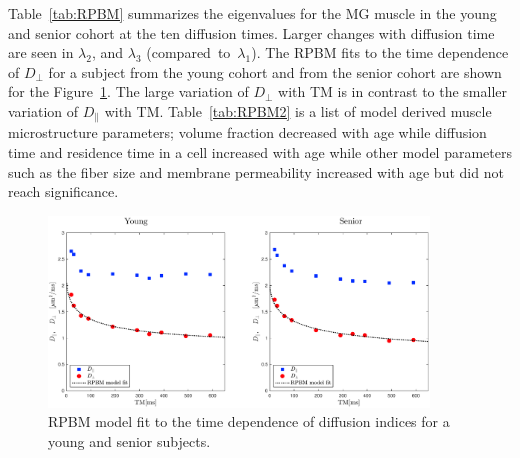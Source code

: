 Table~\ref{tab:RPBM} summarizes the eigenvalues for the MG muscle in the young and senior cohort at the ten diffusion times. 
Larger changes with diffusion time are seen in $\lambda_2$, and $\lambda_3$ (compared~to~$\lambda_1$). 
The RPBM fits to the time dependence of $D_\perp$ for a subject from the young cohort and from the senior cohort are shown for the Figure~\ref{fig:RPBM fit}. The large variation of $D_\perp$ with TM is in contrast to the smaller variation of $D_\parallel$ with TM.
Table~\ref{tab:RPBM2} is a list of model derived muscle microstructure parameters; volume fraction decreased with age while diffusion time and residence time in a cell increased with age while other model parameters such as the fiber size and membrane permeability increased with age but did not reach significance.
\begin{figure}[!htb]
\vspace{+0.2cm}
\centering
\includegraphics[width=0.9\textwidth]{Figures/RPBM_fit.pdf}
\caption[RPBM model fit to the time dependence of diffusion indices for a young and senior subjects]{RPBM model fit to the time dependence of diffusion indices for a young and senior subjects.}
\label{fig:RPBM fit}
\end{figure}
